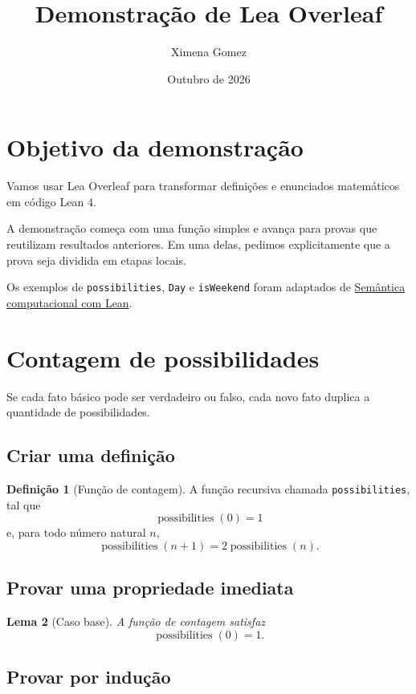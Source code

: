 \documentclass[11pt,a4paper]{article}
\title{Demonstração de Lea Overleaf}
\author{Ximena Gomez}
\date{Outubro de 2026}
\theoremstyle{definition}
\newtheorem{definition}{Definição}[section]
\theoremstyle{plain}
\newtheorem{lemma}[definition]{Lema}
\begin{document}
\maketitle

\section*{Objetivo da demonstração}

Vamos usar Lea Overleaf para transformar definições e enunciados
matemáticos em código Lean 4.

A demonstração começa com uma função simples e avança para provas
que reutilizam resultados anteriores. Em uma delas, pedimos
explicitamente que a prova seja dividida em etapas locais.

Os exemplos de \texttt{possibilities}, \texttt{Day} e
\texttt{isWeekend} foram adaptados de
\href{https://emap-nlp.github.io/book/}
{Semântica computacional com Lean}.

\section{Contagem de possibilidades}

Se cada fato básico pode ser verdadeiro ou falso, cada novo fato
duplica a quantidade de possibilidades.

\subsection{Criar uma definição}

\begin{definition}[Função de contagem]
\label{possibilities}
A função recursiva chamada \texttt{possibilities}, tal que
\[
  \operatorname{possibilities}(0)=1
\]
e, para todo número natural $n$,
\[
  \operatorname{possibilities}(n+1)
  =2\operatorname{possibilities}(n).
\]
\end{definition}


\subsection{Provar uma propriedade imediata}

\begin{lemma}[Caso base]
\label{possibilities_zero}
A função de contagem satisfaz
\[
  \operatorname{possibilities}(0)=1.
\]
\end{lemma}

\subsection{Provar por indução}
\end{document}
